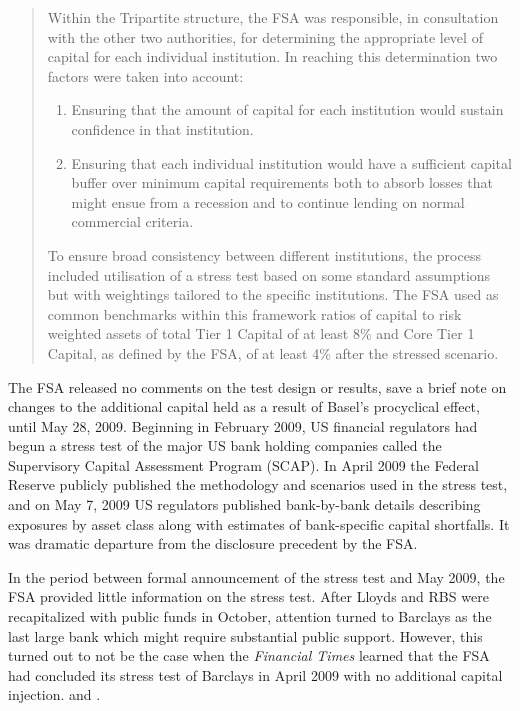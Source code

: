 \documentclass[12pt]{article}
\begin{document}
\begin{quote}
  Within the Tripartite structure, the FSA was responsible, in consultation with the other two authorities, for determining the appropriate level of capital for each individual institution. In reaching this determination two factors were taken into account:

  \begin{enumerate}
    \item Ensuring that the amount of capital for each institution would sustain confidence in that institution.
    \item Ensuring that each individual institution would have a sufficient capital buffer over minimum capital requirements both to absorb losses that might ensue from a recession and to continue lending on normal commercial criteria.
  \end{enumerate}

  To ensure broad consistency between different institutions, the process included utilisation of a stress test based on some standard assumptions but with weightings tailored to the specific institutions. The FSA used as common benchmarks within this framework ratios of capital to risk weighted assets of total Tier 1 Capital of at least 8\% and Core Tier 1 Capital, as defined by the FSA, of at least 4\% after the stressed scenario.

\end{quote}

The FSA released no comments on the test design or results, save a brief note on changes to the additional capital held as a result of Basel's procyclical effect, until May 28, 2009. Beginning in February 2009, US financial regulators had begun a stress test of the major US bank holding companies called the Supervisory Capital Assessment Program (SCAP). In April 2009 the Federal Reserve publicly published the methodology and scenarios used in the stress test, and on May 7, 2009 US regulators published bank-by-bank details describing exposures by asset class along with estimates of bank-specific capital shortfalls. It was dramatic departure from the disclosure precedent by the FSA.

In the period between formal announcement of the stress test and May 2009, the FSA provided little information on the stress test. After Lloyds and RBS were recapitalized with public funds in October, attention turned to Barclays as the last large bank which might require substantial public support. However, this turned out to not be the case when the \textit{Financial Times} learned that the FSA had concluded its stress test of Barclays in April 2009 with no additional capital injection. \citep{Barclays1} and \citep{Lex}.
\end{document}
